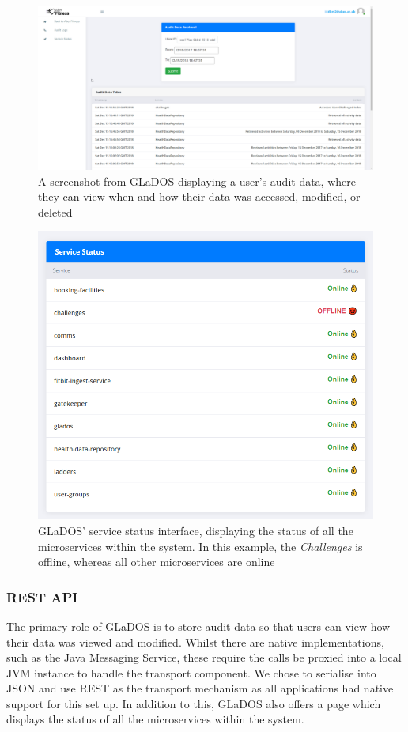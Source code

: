 \begin{figure}[H]
    \centering
    \includegraphics[width=\textwidth]{Images/service_glados.png}
    \caption{A screenshot from GLaDOS displaying a user's audit data, where they can view when and how their data was accessed, modified, or deleted}
\end{figure}

\begin{figure}[H]
    \centering
    \includegraphics[width=\textwidth]{Images/service_status.png}
    \caption{GLaDOS' service status interface, displaying the status of all the microservices within the system. In this example, the \textit{Challenges} is offline, whereas all other microservices are online}
\end{figure}

\subsubsection{REST API}
\par
The primary role of GLaDOS is to store audit data so that users can view how their data was viewed and modified. Whilst there are native implementations, such as the Java Messaging Service, these require the calls be proxied into a local JVM instance to handle the transport component. We chose to serialise into JSON and use REST as the transport mechanism as all applications had native support for this set up. In addition to this, GLaDOS also offers a page which displays the status of all the microservices within the system.


